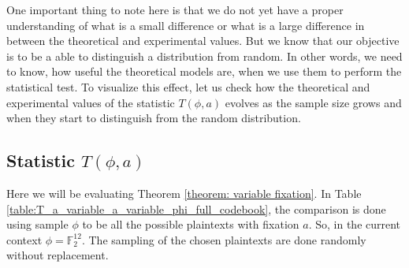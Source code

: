 \par \noindent One important thing to note here is that we do not yet have a proper understanding of what is a small difference or what is a large difference in between the theoretical and experimental values. But we know that our objective is to be a able to distinguish a distribution from random. In other words, we need to know, how useful the theoretical models are, when we use them to perform the statistical test. To visualize this effect, let us check how the theoretical and experimental values of the statistic $T\left(\phi,a\right)$ evolves as the sample size grows and when they start to distinguish from the random distribution.

\subsection{Statistic $T\left(\phi,a\right)$}
\iffalse
Here we will be evaluating Theorem \ref{theorem: variable fixation}. In Table \ref{table:T_a_variable_a_variable_phi_full_codebook}, the comparison is done using sample $\phi$ to be all the possible plaintexts with fixation $a$. So, in the current context $\phi = \mathbb{F}_2^{12}$. The sampling of the chosen plaintexts are done randomly without replacement. 
